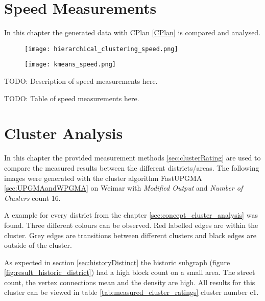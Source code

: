 \section{Speed Measurements} \label{sec:measurements-speed}
In this chapter the generated data with CPlan \ref{CPlan} is compared and analysed.

\begin{figure}
    \centering
    \begin{mdframed}[style=mdthight]
        \texttt{[image: hierarchical\_clustering\_speed.png]}
    \end{mdframed}
    \caption{\label{fig:hierarchical_clustering_speed}}
\end{figure}

\begin{figure}
    \centering
    \begin{mdframed}[style=mdthight]
        \texttt{[image: kmeans\_speed.png]}
    \end{mdframed}
    \caption{\label{fig:kmeans_speed}}
\end{figure}

TODO: Description of speed measurements here. 

TODO: Table of speed measurements here.

\pagebreak
\section{Cluster Analysis}
\label{sec:measurements-cluster-analysis}
In this chapter the provided measurement methods \ref{sec:clusterRating} are used to compare the measured results between the different districts/areas. The following images were generated with the cluster algorithm FastUPGMA \ref{sec:UPGMAandWPGMA} on Weimar with \textit{Modified Output} and \textit{Number of Clusters} count 16.

A example for every district from the chapter \ref{sec:concept_cluster_analysis} was found. Three different colours can be observed. Red labelled edges are within the cluster. Grey edges are transitions between different clusters and black edges are outside of the cluster.

As expected in section \ref{sec:historyDistinct} the historic subgraph (figure \ref{fig:result_historic_district}) had a high block count on a small area. The street count, the vertex connections mean and the density are high. All results for this cluster can be viewed in table \ref{tab:measured_cluster_ratings} cluster number c1.

